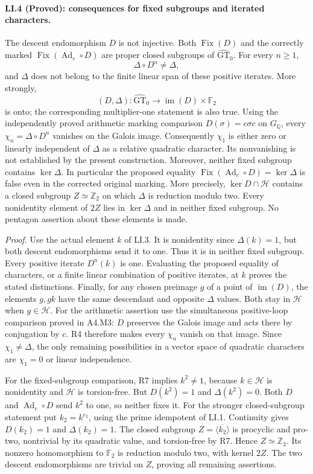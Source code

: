 \paragraph{LI.4 (Proved): consequences for fixed subgroups and iterated characters.}
The descent endomorphism $D$ is not injective. Both
$\operatorname{Fix}(D)$ and the correctly marked
$\operatorname{Fix}(\operatorname{Ad}_c\circ D)$ are proper
closed subgroups of $\widehat{\mathrm{GT}}_0$. For every $n\geq1$,
\[
 \Delta\circ D^n\ne\Delta,
\]
and $\Delta$ does not belong to the finite linear span of these
positive iterates. More strongly,
\[
 (D,\Delta):\widehat{\mathrm{GT}}_0
       \longrightarrow\operatorname{im}(D)\times\mathbb F_2
\]
is onto; the corresponding multiplier-one statement is also true.
Using the independently proved arithmetic marking comparison
$D(\sigma)=c\sigma c$ on $G_{\mathbb Q}$, every
$\chi_n=\Delta\circ D^n$ vanishes on the Galois image.
Consequently $\chi_1$ is either zero or linearly independent of
$\Delta$ as a relative quadratic character. Its nonvanishing
is not established by the present construction.
Moreover, neither fixed subgroup contains $\ker\Delta$.
In particular the proposed equality
$\operatorname{Fix}(\operatorname{Ad}_c\circ D)=\ker\Delta$
is false even in the corrected original marking. More precisely,
$\ker D\cap\mathcal H$ contains a closed subgroup
$Z\simeq\mathbb Z_2$ on which $\Delta$ is reduction modulo two.
Every nonidentity element of $2Z$ lies in $\ker\Delta$ and in
neither fixed subgroup. No pentagon assertion about these
elements is made.

\emph{Proof.}
Use the actual element $k$ of LI.3. It is nonidentity since
$\Delta(k)=1$, but both descent endomorphisms send it to one.
Thus it is in neither fixed subgroup. Every positive iterate
$D^n(k)$ is one. Evaluating the proposed equality of characters,
or a finite linear combination of positive iterates, at $k$
proves the stated distinctions. Finally, for any chosen preimage
$g$ of a point of $\operatorname{im}(D)$, the elements $g,gk$
have the same descendant and opposite $\Delta$ values.
Both stay in $\mathcal H$ when $g\in\mathcal H$.
For the arithmetic assertion use the simultaneous positive-loop
comparison proved in A4.M3: $D$ preserves the Galois image and
acts there by conjugation by $c$. R4 therefore makes every
$\chi_n$ vanish on that image. Since $\chi_1\ne\Delta$,
the only remaining possibilities in a vector space of quadratic
characters are $\chi_1=0$ or linear independence.

For the fixed-subgroup comparison, R7 implies $k^2\ne1$,
because $k\in\mathcal H$ is nonidentity and $\mathcal H$ is
torsion-free. But $D(k^2)=1$ and $\Delta(k^2)=0$.
Both $D$ and $\operatorname{Ad}_c\circ D$ send $k^2$ to one,
so neither fixes it. For the stronger closed-subgroup statement
put $k_2=k^{e_2}$, using the prime idempotent of LI.1.
Continuity gives $D(k_2)=1$ and $\Delta(k_2)=1$.
The closed subgroup $Z=\overline{\langle k_2\rangle}$ is
procyclic and pro-two, nontrivial by its quadratic value, and
torsion-free by R7. Hence $Z\simeq\mathbb Z_2$.
Its nonzero homomorphism to $\mathbb F_2$ is reduction modulo
two, with kernel $2Z$. The two descent endomorphisms are
trivial on $Z$, proving all remaining assertions.

